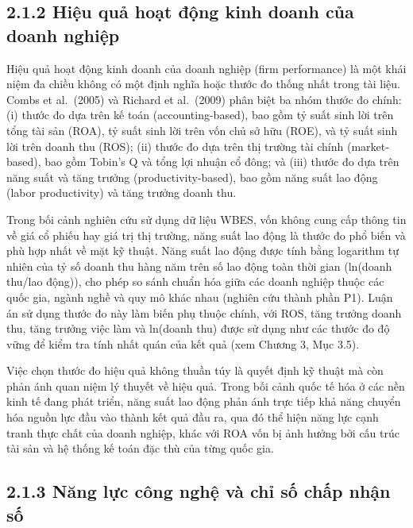 \documentclass[
  a4paper,
  13pt]{extreport}
\begin{document}
\hypertarget{hiux1ec7u-quux1ea3-houx1ea1t-ux111ux1ed9ng-kinh-doanh-cux1ee7a-doanh-nghiux1ec7p}{%
\subsection{2.1.2 Hiệu quả hoạt động kinh doanh của doanh
nghiệp}\label{hiux1ec7u-quux1ea3-houx1ea1t-ux111ux1ed9ng-kinh-doanh-cux1ee7a-doanh-nghiux1ec7p}}

Hiệu quả hoạt động kinh doanh của doanh nghiệp (firm performance) là một
khái niệm đa chiều không có một định nghĩa hoặc thước đo thống nhất
trong tài liệu. Combs et al.~(2005) và Richard et al.~(2009) phân biệt
ba nhóm thước đo chính: (i) thước đo dựa trên kế toán
(accounting-based), bao gồm tỷ suất sinh lời trên tổng tài sản (ROA), tỷ
suất sinh lời trên vốn chủ sở hữu (ROE), và tỷ suất sinh lời trên doanh
thu (ROS); (ii) thước đo dựa trên thị trường tài chính (market-based),
bao gồm Tobin's Q và tổng lợi nhuận cổ đông; và (iii) thước đo dựa trên
năng suất và tăng trưởng (productivity-based), bao gồm năng suất lao
động (labor productivity) và tăng trưởng doanh thu.

Trong bối cảnh nghiên cứu sử dụng dữ liệu WBES, vốn không cung cấp thông
tin về giá cổ phiếu hay giá trị thị trường, năng suất lao động là thước
đo phổ biến và phù hợp nhất về mặt kỹ thuật. Năng suất lao động được
tính bằng logarithm tự nhiên của tỷ số doanh thu hàng năm trên số lao
động toàn thời gian (ln(doanh thu/lao động)), cho phép so sánh chuẩn hóa
giữa các doanh nghiệp thuộc các quốc gia, ngành nghề và quy mô khác nhau
(nghiên cứu thành phần P1). Luận án sử dụng thước đo này làm biến phụ
thuộc chính, với ROS, tăng trưởng doanh thu, tăng trưởng việc làm và
ln(doanh thu) được sử dụng như các thước đo độ vững để kiểm tra tính
nhất quán của kết quả (xem Chương 3, Mục 3.5).

Việc chọn thước đo hiệu quả không thuần túy là quyết định kỹ thuật mà
còn phản ánh quan niệm lý thuyết về hiệu quả. Trong bối cảnh quốc tế hóa
ở các nền kinh tế đang phát triển, năng suất lao động phản ánh trực tiếp
khả năng chuyển hóa nguồn lực đầu vào thành kết quả đầu ra, qua đó thể
hiện năng lực cạnh tranh thực chất của doanh nghiệp, khác với ROA vốn bị
ảnh hưởng bởi cấu trúc tài sản và hệ thống kế toán đặc thù của từng quốc
gia.

\hypertarget{nux103ng-lux1ef1c-cuxf4ng-nghux1ec7-vuxe0-chux1ec9-sux1ed1-chux1ea5p-nhux1eadn-sux1ed1}{%
\subsection{2.1.3 Năng lực công nghệ và chỉ số chấp nhận
số}\label{nux103ng-lux1ef1c-cuxf4ng-nghux1ec7-vuxe0-chux1ec9-sux1ed1-chux1ea5p-nhux1eadn-sux1ed1}}
\end{document}
